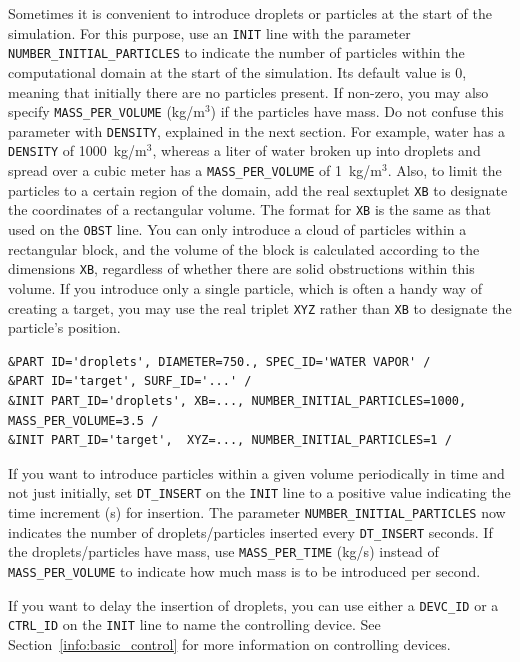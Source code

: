 \documentclass[11pt]{book}
\newcommand{\ct}{\tt\small}
\begin{document}
Sometimes it is convenient to introduce droplets or particles at the start of the simulation. For this purpose, use an {\ct INIT} line with the parameter
{\ct NUMBER\_INITIAL\_PARTICLES} to indicate the number of particles within the computational domain at the start of the simulation.
Its default value is 0, meaning that initially there are no particles present. If non-zero, you may also specify {\ct MASS\_PER\_VOLUME} (kg/m$^3$) if the
particles have mass. Do not confuse this parameter with {\ct DENSITY}, explained in the next section.
For example, water has a {\ct DENSITY} of 1000~kg/m$^3$, whereas a liter of water broken up into droplets and spread over a cubic meter has a {\ct MASS\_PER\_VOLUME} of 1~kg/m$^3$.
Also, to limit the particles to a certain region of the domain, add the real sextuplet {\ct XB} to designate the coordinates of a rectangular volume.
The format for {\ct XB} is the same as that used on the {\ct OBST} line. You can only introduce a cloud of particles within a rectangular block,
and the volume of the block is calculated according to the dimensions {\ct XB}, regardless of whether there are solid obstructions within this volume. If you introduce
only a single particle, which is often a handy way of creating a target, you may use the real triplet {\ct XYZ} rather than {\ct XB} to designate the particle's position.

\footnotesize
\begin{verbatim}
&PART ID='droplets', DIAMETER=750., SPEC_ID='WATER VAPOR' /
&PART ID='target', SURF_ID='...' /
&INIT PART_ID='droplets', XB=..., NUMBER_INITIAL_PARTICLES=1000, MASS_PER_VOLUME=3.5 /
&INIT PART_ID='target',  XYZ=..., NUMBER_INITIAL_PARTICLES=1 /
\end{verbatim} \normalsize

\noindent
If you want to introduce particles within a given volume periodically in time and not just initially, set {\ct DT\_INSERT} on
the {\ct INIT} line to a positive value indicating the time increment (s) for insertion. The parameter {\ct NUMBER\_INITIAL\_PARTICLES} now indicates the
number of droplets/particles inserted every {\ct DT\_INSERT} seconds. If the droplets/particles have mass, use {\ct MASS\_PER\_TIME} (kg/s) instead of {\ct MASS\_PER\_VOLUME} to
indicate how much mass is to be introduced per second.

If you want to delay the insertion of droplets, you can use either a {\ct DEVC\_ID} or a {\ct CTRL\_ID} on the {\ct INIT} line to name the controlling device.
See Section~\ref{info:basic_control} for more information on controlling devices.
\end{document}
